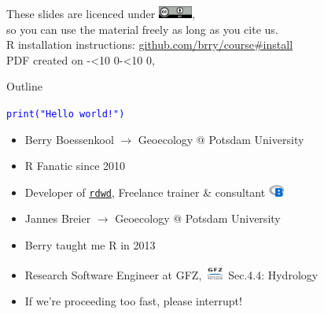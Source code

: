 \documentclass[xcolor=table,      handout ,    xcolor=dvipsnames]{beamer}\usepackage[]{graphicx}\usepackage[]{color}
\newcommand{\rcode}[1]{\texttt{\textcolor{Blue}{#1}}}
\newcommand{\leadingzero}[1]{\ifnum #1<10 0\the#1\else\the#1\fi}
\begin{document}
{\begin{frame}
\begin{center}
These slides are licenced under
\href{https://creativecommons.org/licenses/by/4.0}{\includegraphics[width=3em]{externalfig/ccby.png}},\\
so you can use the material freely as long as you cite us.\\[1em]
R installation instructions: \href{https://github.com/brry/course\#install}{github.com/brry/course\#install}\\[2em]
\scriptsize
PDF created on \the\year-\leadingzero{\month}-\leadingzero{\day}, \currenttime\ \\[1em]
\end{center}
\end{frame}
}


\begin{frame}{Outline}
\tableofcontents[hideallsubsections]
\label{toc}
\end{frame}


\begin{frame}{\rcode{print("Hello world!")}}
\begin{itemize}[<+->]
\item Berry Boessenkool $\rightarrow$ Geoecology @ Potsdam University
\item R Fan\onslide<+->atic \onslide<+-> since 2010
\item Developer of \href{https://github.com/brry/rdwd\#rdwd}{\texttt{rdwd}},
 \onslide<+-> Freelance trainer \& consultant \href{https://brry.github.io}{\includegraphics[width=0.5cm]{externalfig/Blogo.png}}\\[1em]
\item Jannes Breier $\rightarrow$ Geoecology @ Potsdam University
\item Berry taught me R in 2013 \smiley{}
\item \href{https://www.linkedin.com/in/jbreier/}{\faLinkedinSquare} Research Software Engineer at GFZ, \href{https://www.gfz-potsdam.de/en/staff/jannes-breier/sec44/}{\includegraphics[width=0.65cm]{externalfig/GFZ.png}} Sec.4.4: Hydrology \\[1em]
\item \alert{If we're proceeding too fast, please interrupt!}
\end{itemize}
\end{frame}
\end{document}
